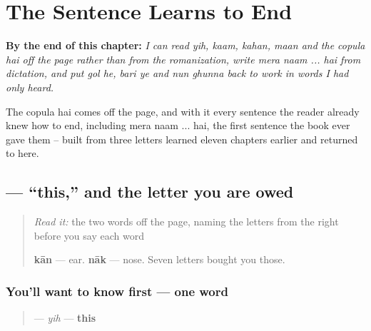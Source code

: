 
\chapter{The Sentence Learns to End}
\label{ch:ur-script-copula}

\begin{chapteropening}
\textbf{By the end of this chapter:} \emph{I can read yih, kaam, kahan, maan and the copula hai off the page rather than from the romanization, write mera naam ... hai from dictation, and put gol he, bari ye and nun ghunna back to work in words I had only heard.}

The copula hai comes off the page, and with it every sentence the reader already knew how to end, including mera naam ... hai, the first sentence the book ever gave them -- built from three letters learned eleven chapters earlier and returned to here.
\end{chapteropening}

\section[\texorpdfstring{\ur{یہ} (yih)}{یہ (yih)}]{ — \textquotedblleft{}this,\textquotedblright{} and the letter you are owed}

\label{lesson:UR-C17-yih}



\begin{quote}
\emph{Read it:} the two words off the page, naming the letters from the right before you say each word

\begin{quote}
\end{quote}

\begin{quote}
\end{quote}

\textbf{kān} — ear. \textbf{nāk} — nose. Seven letters bought you those.
\end{quote}

\subsection*{You'll want to know first — one word}
\begin{quote}
\textbf{} — \emph{yih} — \textbf{this}
\end{quote}

